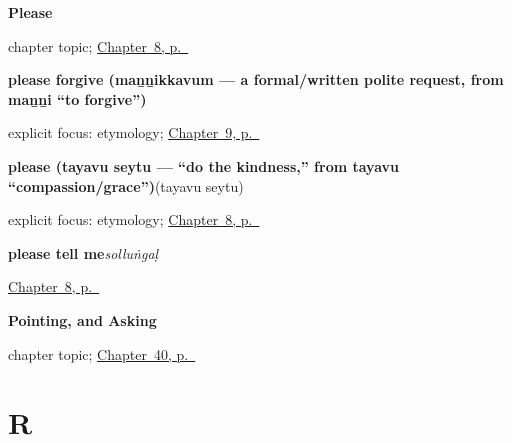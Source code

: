 \noindent\begin{minipage}[t]{\linewidth}
\raggedright
\textbf{Please}\par
\footnotesize chapter topic; \hyperref[ch:ta-please]{Chapter~8, p.~\pageref*{ch:ta-please}}
\end{minipage}\par\smallskip

\noindent\begin{minipage}[t]{\linewidth}
\raggedright
\textbf{please forgive (maṉṉikkavum — a formal/written polite request, from  maṉṉi \textquotedblleft{}to forgive\textquotedblright{})}\enspace\emph{}\par
\footnotesize explicit focus: etymology; \hyperref[ch:ta-sorry]{Chapter~9, p.~\pageref*{ch:ta-sorry}}
\end{minipage}\par\smallskip

\noindent\begin{minipage}[t]{\linewidth}
\raggedright
\textbf{please (tayavu seytu — \textquotedblleft{}do the kindness,\textquotedblright{} from  tayavu \textquotedblleft{}compassion/grace\textquotedblright{})}\enspace\emph{}\enspace(tayavu seytu)\par
\footnotesize explicit focus: etymology; \hyperref[ch:ta-please]{Chapter~8, p.~\pageref*{ch:ta-please}}
\end{minipage}\par\smallskip

\noindent\begin{minipage}[t]{\linewidth}
\raggedright
\textbf{please tell me}\enspace\emph{solluṅgaḷ}\par
\footnotesize \hyperref[ch:ta-please]{Chapter~8, p.~\pageref*{ch:ta-please}}
\end{minipage}\par\smallskip

\noindent\begin{minipage}[t]{\linewidth}
\raggedright
\textbf{Pointing, and Asking}\par
\footnotesize chapter topic; \hyperref[ch:ta-pointing-and-asking]{Chapter~40, p.~\pageref*{ch:ta-pointing-and-asking}}
\end{minipage}\par\smallskip

\section*{R}

